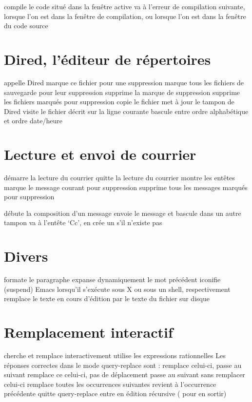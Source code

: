  compile le code situ\'e dans la fen\^etre active
 va \`a l'erreur de compilation suivante, lorsque l'on est
dans la fen\^etre de compilation, ou
 lorsque l'on est dans la fen\^etre du code source

\section{Dired, l'\'editeur de r\'epertoires}

  appelle Dired
 marque ce fichier pour une suppression
\key{\~{}} marque tous les fichiers de sauvegarde pour leur suppression
 supprime la marque de suppression
 supprime les fichiers marqu\'es pour suppression
 copie le fichier
 met \`a jour le tampon de Dired
 visite le fichier d\'ecrit sur la ligne courante
 bascule entre ordre alphab\'etique et ordre date/heure

\section{Lecture et envoi de courrier}

 d\'emarre la lecture du courrier
 quitte la lecture du courrier
 montre les ent\^etes
 marque le message courant pour suppression
 supprime tous les messages marqu\'es pour suppression

 d\'ebute la composition d'un message
 envoie le message et bascule dans un autre tampon
 va \`a l'ent\^ete `Cc', en cr\'ee un s'il n'existe pas

\section{Divers}

 formate le paragraphe
 expanse dynamiquement le mot pr\'ec\'edent
 iconifie (suspend) Emacs lorsqu'il s'ex\'ecute sous X ou
  sous un shell, respectivement
 remplace le texte en cours d'\'edition par le
texte du fichier sur disque

\section{Remplacement interactif}

 cherche et remplace interactivement
 utilise les expressions rationnelles
\askip
Les r\'eponses correctes dans le mode query-replace sont :
\askip
{} remplace celui-ci, passe au suivant
\key{,} remplace ce celui-ci, pas de d\'eplacement
 passe au suivant sans remplacer celui-ci
\key{!} remplace toutes les occurrences suivantes
\key{\^{}} revient \`a l'occurrence pr\'ec\'edente
 quitte query-replace
 entre en \'edition r\'ecursive ( pour en sortir)

